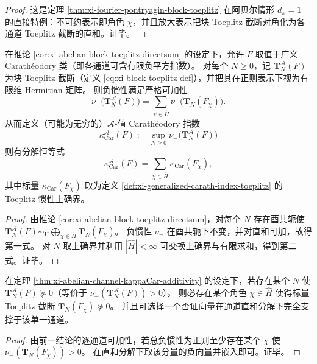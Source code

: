 \begin{proof}
这是定理 \ref{thm:xi-fourier-pontryagin-block-toeplitz} 在阿贝尔情形 \(d_\pi=1\) 的直接特例：不可约表示即角色 \(\chi\)，并且放大表示把块 Toeplitz 截断对角化为各通道 Toeplitz 截断的直和。证毕。
\end{proof}

\begin{theorem}\label{thm:xi-abelian-channel-kappaCar-additivity}
在推论 \ref{cor:xi-abelian-block-toeplitz-directsum} 的设定下，允许 \(F\) 取值于广义 Carath\'eodory 类（即各通道可含有限负平方指数）。
对每个 \(N\ge 0\)，记 \(\mathbf{T}^{\mathcal{A}}_N(F)\) 为块 Toeplitz 截断（定义 \eqref{eq:xi-block-toeplitz-def}），并把其在正则表示下视为有限维 Hermitian 矩阵。
则负惯性满足严格可加性
\[
\boxed{\;
\nu_-\!\bigl(\mathbf{T}^{\mathcal{A}}_N(F)\bigr)
=\sum_{\chi\in\widehat H}\nu_-\!\bigl(\mathbf{T}_N(F_\chi)\bigr).\;}
\]
从而定义（可能为无穷的）\(\mathcal{A}\)-值 Carath\'eodory 指数
\[
\kappa_{\mathrm{Car}}^{\mathcal{A}}(F):=\sup_{N\ge 0}\nu_-\!\bigl(\mathbf{T}^{\mathcal{A}}_N(F)\bigr)
\]
则有分解恒等式
\[
\boxed{\;
\kappa_{\mathrm{Car}}^{\mathcal{A}}(F)
=\sum_{\chi\in\widehat H}\kappa_{\mathrm{Car}}(F_\chi),\;}
\]
其中标量 \(\kappa_{\mathrm{Car}}(F_\chi)\) 取为定义 \ref{def:xi-generalized-carath-index-toeplitz} 的 Toeplitz 惯性上确界。
\end{theorem}
\begin{proof}
由推论 \ref{cor:xi-abelian-block-toeplitz-directsum}，对每个 \(N\) 存在酉共轭使
\(
\mathbf{T}^{\mathcal{A}}_N(F)\sim_{\mathrm U}\bigoplus_{\chi\in\widehat H}\mathbf{T}_N(F_\chi)
\)。
负惯性 \(\nu_-\) 在酉共轭下不变，并对直和可加，故得第一式。
对 \(N\) 取上确界并利用 \(|\widehat H|<\infty\) 可交换上确界与有限求和，得到第二式。证毕。
\end{proof}

\begin{corollary}[负性证书的单通道局域化]\label{cor:xi-abelian-channel-negativity-localization}
在定理 \ref{thm:xi-abelian-channel-kappaCar-additivity} 的设定下，若存在某个 \(N\) 使 \(\mathbf{T}^{\mathcal{A}}_N(F)\nsucceq 0\)（等价于 \(\nu_-(\mathbf{T}^{\mathcal{A}}_N(F))>0\)），
则必存在某个角色 \(\chi\in\widehat H\) 使得标量 Toeplitz 截断 \(\mathbf{T}_N(F_\chi)\nsucceq 0\)。
并且可选择一个否证向量在通道直和分解下完全支撑于该单一通道。
\end{corollary}
\begin{proof}
由前一结论的逐通道可加性，若总负惯性为正则至少存在某个 \(\chi\) 使 \(\nu_-(\mathbf{T}_N(F_\chi))>0\)。
在直和分解下取该分量的负向量并嵌入即可。证毕。
\end{proof}

